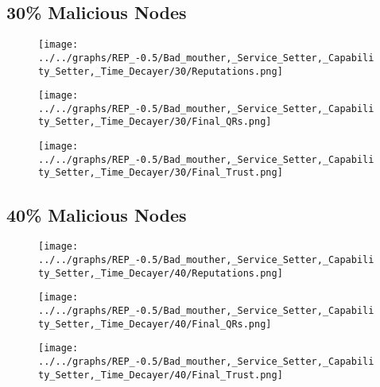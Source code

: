 \begin{minipage}[t]{0.49\columnwidth}
\subsection*{30\% Malicious Nodes}
    \begin{figure}[H]
        \centering
        \texttt{[image: ../../graphs/REP\_-0.5/Bad\_mouther,\_Service\_Setter,\_Capability\_Setter,\_Time\_Decayer/30/Reputations.png]}
    \end{figure}
    \begin{figure}[H]
        \centering
        \texttt{[image: ../../graphs/REP\_-0.5/Bad\_mouther,\_Service\_Setter,\_Capability\_Setter,\_Time\_Decayer/30/Final\_QRs.png]}
    \end{figure}
\end{minipage}
\begin{minipage}[t]{0.49\columnwidth}
    \begin{figure}[H]
        \centering
        \texttt{[image: ../../graphs/REP\_-0.5/Bad\_mouther,\_Service\_Setter,\_Capability\_Setter,\_Time\_Decayer/30/Final\_Trust.png]}
    \end{figure}
\end{minipage}

\begin{minipage}[t]{0.49\columnwidth}
\subsection*{40\% Malicious Nodes}
    \begin{figure}[H]
        \centering
        \texttt{[image: ../../graphs/REP\_-0.5/Bad\_mouther,\_Service\_Setter,\_Capability\_Setter,\_Time\_Decayer/40/Reputations.png]}
    \end{figure}
    \begin{figure}[H]
        \centering
        \texttt{[image: ../../graphs/REP\_-0.5/Bad\_mouther,\_Service\_Setter,\_Capability\_Setter,\_Time\_Decayer/40/Final\_QRs.png]}
    \end{figure}
\end{minipage}
\begin{minipage}[t]{0.49\columnwidth}
    \begin{figure}[H]
        \centering
        \texttt{[image: ../../graphs/REP\_-0.5/Bad\_mouther,\_Service\_Setter,\_Capability\_Setter,\_Time\_Decayer/40/Final\_Trust.png]}
    \end{figure}
\end{minipage}

